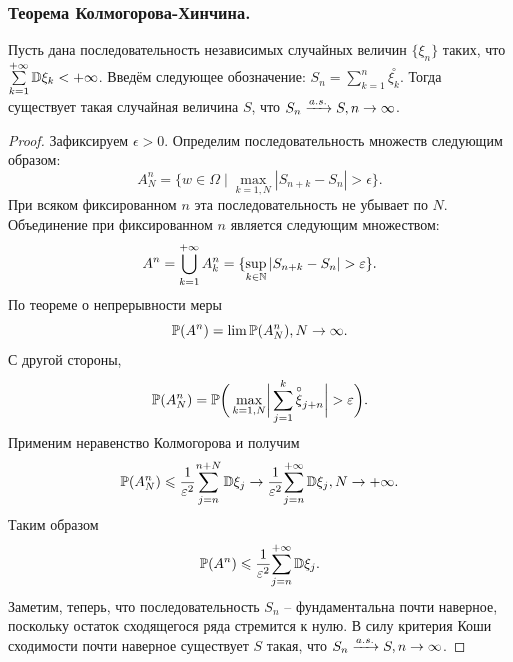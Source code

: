 \subsubsection{Теорема Колмогорова-Хинчина.}
\begin{theorem}
    Пусть дана последовательность независимых случайных величин $\{\xi_n\}$ таких, что $\sum\limits_{k = 1}^{+\infty} \D \xi_k < +\infty$.
    Введём следующее обозначение: $S_n = \sum\limits_{k = 1}^{n} \overset{\circ}{\xi_k}$.
    Тогда существует такая случайная величина $S$, что $S_n \xrightarrow{a.s.} S, n \ra \infty$.
\end{theorem}
\begin{proof}
    Зафиксируем $\epsilon > 0$.
    Определим последовательность множеств следующим образом:
    \[
        A^n_N = \{w \in \Omega \mid \max\limits_{k = 1, N} |S_{n + k} - S_n| > \epsilon\}.
    \]
    При всяком фиксированном $n$ эта последовательность не убывает по $N$.
    Объединение при фиксированном $n$ является следующим множеством:
    \[
        A^n = \bigcup\limits_{k = 1}^{+\infty} A^n_k = \{\sup\limits_{k \in \N} |S_{n + k} - S_n| > \epsilon\}.
    \]
    По теореме о непрерывности меры
    \[
        \P(A^n) = \lim \P(A^n_N), N \ra \infty.
    \]
    С другой стороны,
    \[
        \P(A^n_N) = \P\biggr(\max\limits_{k = 1, N} \biggr|\sum\limits_{j = 1}^{k} \overset{\circ}{\xi}_{j + n}\biggr| > \epsilon\biggr).
    \]
    Применим неравенство Колмогорова и получим
    \[
        \P(A^n_N) \leq \dfrac{1}{\epsilon^2}{\sum_{j = n}^{n + N} \D \xi_j} \ra \dfrac{1}{\epsilon^2}{\sum_{j = n}^{+\infty} \D \xi_j}, N \ra +\infty.
    \]
    Таким образом
    \[
        \P(A^n) \leq \dfrac{1}{\epsilon^2}{\sum_{j = n}^{+\infty} \D\xi_j}.
    \]
    Заметим, теперь, что последовательность $S_n$ -- фундаментальна почти наверное, поскольку остаток сходящегося ряда стремится к нулю.
    В силу критерия Коши сходимости почти наверное существует $S$ такая, что $S_n \xrightarrow{a.s.} S, n \ra \infty$.
\end{proof}
